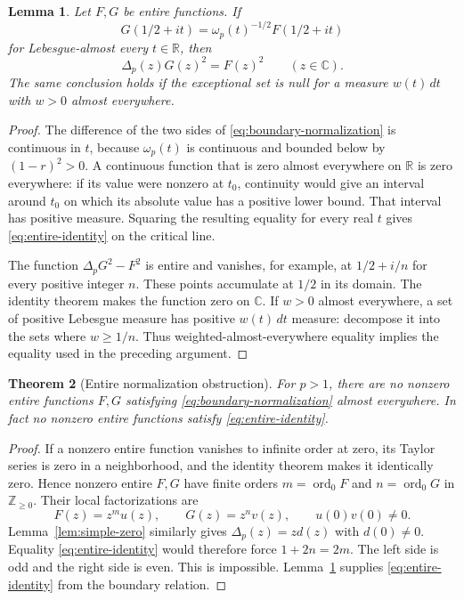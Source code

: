 \documentclass[11pt,letterpaper]{article}
\newtheorem{theorem}{Theorem}[section]
\newtheorem{lemma}[theorem]{Lemma}
\theoremstyle{definition}
\theoremstyle{remark}
\newcommand{\R}{\mathbb R}
\newcommand{\C}{\mathbb C}
\newcommand{\Z}{\mathbb Z}
\newcommand{\ord}{\operatorname{ord}}
\begin{document}
\begin{lemma}
\label{lem:boundary-identity}
Let $F,G$ be entire functions. If
\begin{equation}
 G(1/2+it)=\omega_p(t)^{-1/2}F(1/2+it)
 \label{eq:boundary-normalization}
\end{equation}
for Lebesgue-almost every $t\in\R$, then
\begin{equation}
 \Delta_p(z)G(z)^2=F(z)^2\qquad(z\in\C).
 \label{eq:entire-identity}
\end{equation}
The same conclusion holds if the exceptional set is null for a
measure $w(t)\,dt$ with $w>0$ almost everywhere.
\end{lemma}
\begin{proof}
The difference of the two sides of
\eqref{eq:boundary-normalization} is continuous in $t$, because
$\omega_p(t)$ is continuous and bounded below by $(1-r)^2>0$.
A continuous function that is zero almost everywhere on $\R$ is
zero everywhere: if its value were nonzero at $t_0$, continuity
would give an interval around $t_0$ on which its absolute value
has a positive lower bound. That interval has positive measure.
Squaring the resulting equality for every real $t$ gives
\eqref{eq:entire-identity} on the critical line.

The function $\Delta_pG^2-F^2$ is entire and vanishes, for example, at
$1/2+i/n$ for every positive integer $n$. These points accumulate
at $1/2$ in its domain. The identity theorem makes the function
zero on $\C$. If $w>0$ almost everywhere, a set of positive
Lebesgue measure has positive $w(t)\,dt$ measure: decompose it
into the sets where $w\geq1/n$. Thus weighted-almost-everywhere
equality implies the equality used in the preceding argument.
\end{proof}

\begin{theorem}[Entire normalization obstruction]
\label{thm:polarization-obstructions:entire}
For $p>1$, there are no nonzero entire functions $F,G$ satisfying
\eqref{eq:boundary-normalization} almost everywhere. In fact no
nonzero entire functions satisfy \eqref{eq:entire-identity}.
\end{theorem}
\begin{proof}
If a nonzero entire function vanishes to infinite order at zero,
its Taylor series is zero in a neighborhood, and the identity
theorem makes it identically zero. Hence nonzero entire $F,G$
have finite orders $m=\ord_0F$ and $n=\ord_0G$ in $\Z_{\geq0}$.
Their local factorizations are
\[
 F(z)=z^m u(z),\qquad G(z)=z^n v(z),\qquad
 u(0)v(0)\ne0.
\]
Lemma~\ref{lem:simple-zero} similarly gives $\Delta_p(z)=zd(z)$ with
$d(0)\ne0$. Equality \eqref{eq:entire-identity} would therefore
force $1+2n=2m$. The left side is odd and the right side is even.
This is impossible. Lemma~\ref{lem:boundary-identity} supplies
\eqref{eq:entire-identity} from the boundary relation.
\end{proof}
\end{document}
